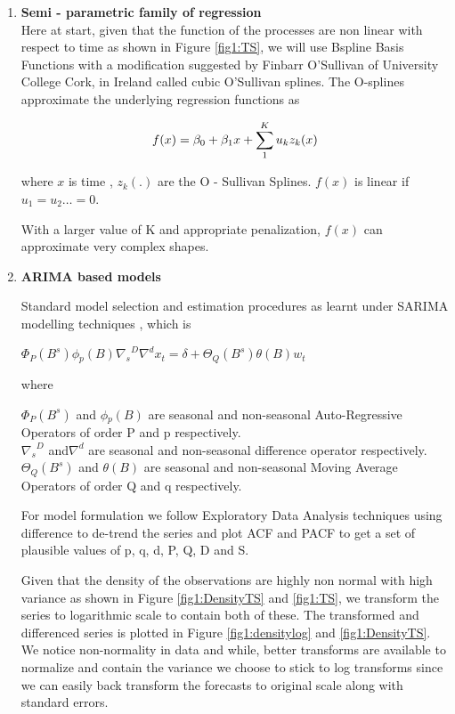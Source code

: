 \documentclass[a4paper]{article}
\begin{document}
\begin{enumerate}
	\item  \textbf{Semi - parametric family of regression ~\cite{RJC2009}  ~\cite{Gam-R-mgcv} }\\
	
	Here at start, given that the function of the processes are non linear with respect to time as shown in Figure \ref{fig1:TS}, we will use Bspline Basis Functions with a modification suggested by Finbarr O’Sullivan of University
	College Cork, in Ireland called cubic O’Sullivan splines. The O-splines approximate the underlying regression functions
	as
	
	$$
	f(x) = \beta_{0} + \beta_{1}x + \sum_{1}^{K}u_kz_k(x)  \\	
	$$	
	
	where $x$ is time , $z_k(.)$ are the O - Sullivan Splines. $f(x)$ is linear if $u_1 = u_2 \dots = 0$.
	
	With a larger value of K and  appropriate penalization, $f(x)$ can approximate very complex shapes.
   
   \newpage
   
	
	\item  \textbf{ ARIMA based models }
	
	Standard model selection and estimation procedures as learnt under SARIMA modelling techniques , which is 
	
    \begin{center}
    		\textbf{$\Phi{_P}{(B^s)}\phi{_p}{(B)}{\nabla{_s}}^D{\nabla}^dx_t = \delta + \Theta{_Q}{(B^s)}\theta{(B)}w_t$}
    \end{center}
where 

$\Phi{_P}{(B^s)}$ and $ \phi{_p}{(B)}$ are seasonal and non-seasonal Auto-Regressive Operators of order P and p
 respectively.  \\
${\nabla{_s}}^D$  and$ {\nabla{}}^d$ are seasonal and non-seasonal difference operator respectively. \\
$\Theta{_Q}{(B^s)}$ and $\theta{(B)}$ are seasonal and non-seasonal Moving Average Operators of order Q and q
respectively.  

For model formulation we follow Exploratory Data Analysis techniques using difference to de-trend the series and plot ACF and PACF to get a set of plausible values of p, q, d, P, Q, D and S. 

Given that the density of the observations are highly non normal with high variance as shown in Figure \ref{fig1:DensityTS} and \ref{fig1:TS}, we transform the series to logarithmic scale to contain both of these. The transformed and differenced series is plotted in Figure \ref{fig1:densitylog} and \ref{fig1:DensityTS}. We notice non-normality in data and while, better transforms are
available to normalize and contain the variance we choose to stick to log transforms since we can easily back transform the forecasts to original scale along with standard errors. 


\end{enumerate}
\end{document}
